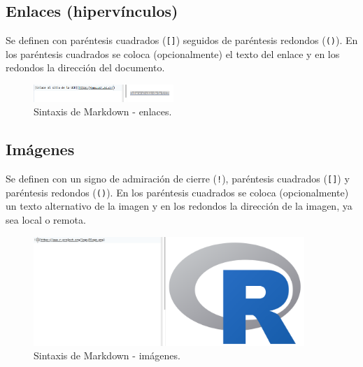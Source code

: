 \documentclass[
  letterpaper,
  DIV=11,
  numbers=noendperiod]{scrreprt}
\begin{document}
\hypertarget{enlaces-hipervuxednculos}{%
\subsection{Enlaces (hipervínculos)}\label{enlaces-hipervuxednculos}}

Se definen con paréntesis cuadrados (\texttt{{[}{]}}) seguidos de
paréntesis redondos (\texttt{()}). En los paréntesis cuadrados se coloca
(opcionalmente) el texto del enlace y en los redondos la dirección del
documento.

\begin{figure}

{\centering \includegraphics[width=2.08in,height=\textheight]{./img/md-enlace.png}

}

\caption{\label{fig-md-enlaces}Sintaxis de Markdown - enlaces.}

\end{figure}

\hypertarget{imuxe1genes}{%
\subsection{Imágenes}\label{imuxe1genes}}

Se definen con un signo de admiración de cierre (\texttt{!}), paréntesis
cuadrados (\texttt{{[}{]}}) y paréntesis redondos (\texttt{()}). En los
paréntesis cuadrados se coloca (opcionalmente) un texto alternativo de
la imagen y en los redondos la dirección de la imagen, ya sea local o
remota.

\begin{figure}

{\centering \includegraphics[width=4.03in,height=\textheight]{./img/md-imagen.png}

}

\caption{\label{fig-md-imagenes}Sintaxis de Markdown - imágenes.}

\end{figure}
\end{document}
